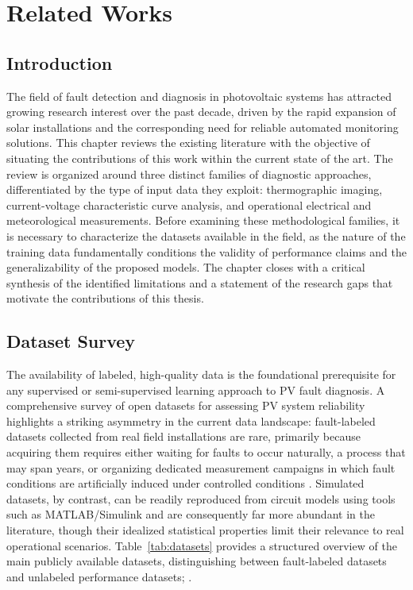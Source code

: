\chapter{Related Works}
\label{ch:related-work}

\section{Introduction}

The field of fault detection and diagnosis in photovoltaic systems has attracted growing research interest over the past decade, driven by the rapid expansion of solar installations and the corresponding need for reliable automated monitoring solutions. This chapter reviews the existing literature with the objective of situating the contributions of this work within the current state of the art. The review is organized around three distinct families of diagnostic approaches, differentiated by the type of input data they exploit: thermographic imaging, current-voltage characteristic curve analysis, and operational electrical and meteorological measurements. Before examining these methodological families, it is necessary to characterize the datasets available in the field, as the nature of the training data fundamentally conditions the validity of performance claims and the generalizability of the proposed models. The chapter closes with a critical synthesis of the identified limitations and a statement of the research gaps that motivate the contributions of this thesis.

\section{Dataset Survey}
\label{sec:data-survey}

The availability of labeled, high-quality data is the foundational prerequisite for any supervised or semi-supervised learning approach to PV fault diagnosis. A comprehensive survey of open datasets for assessing PV system reliability highlights a striking asymmetry in the current data landscape: fault-labeled datasets collected from real field installations are rare, primarily because acquiring them requires either waiting for faults to occur naturally, a process that may span years, or organizing dedicated measurement campaigns in which fault conditions are artificially induced under controlled conditions \citep{chen2025datasets}. Simulated datasets, by contrast, can be readily reproduced from circuit models using tools such as MATLAB/Simulink and are consequently far more abundant in the literature, though their idealized statistical properties limit their relevance to real operational scenarios. Table~\ref{tab:datasets} provides a structured overview of the main publicly available datasets, distinguishing between fault-labeled datasets and unlabeled performance datasets; .

